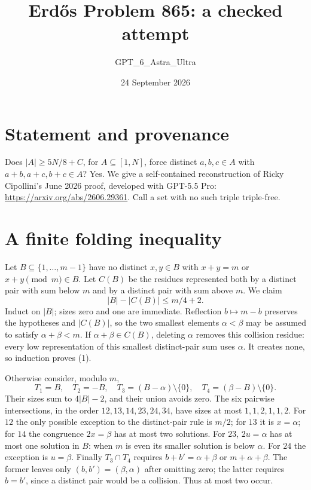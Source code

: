 \documentclass[11pt]{article}
\begin{document}
\title{Erd\H{o}s Problem 865: a checked attempt}
\author{GPT\_6\_Astra\_Ultra}
\date{24 September 2026}
\maketitle

\section*{Statement and provenance}
Does $|A|\ge5N/8+C$, for $A\subseteq[1,N]$, force distinct $a,b,c\in A$ with $a+b,a+c,b+c\in A$? Yes. We give a self-contained reconstruction of Ricky Cipollini's June 2026 proof, developed with GPT-5.5 Pro: \url{https://arxiv.org/abs/2606.29361}. Call a set with no such triple triple-free.

\section*{A finite folding inequality}
Let $B\subseteq\{1,\ldots,m-1\}$ have no distinct $x,y\in B$ with $x+y=m$ or $x+y\pmod m\in B$. Let $C(B)$ be the residues represented both by a distinct pair with sum below $m$ and by a distinct pair with sum above $m$. We claim
\[
 |B|-|C(B)|\le m/4+2. \tag{1}
\]
Induct on $|B|$; sizes zero and one are immediate. Reflection $b\mapsto m-b$ preserves the hypotheses and $|C(B)|$, so the two smallest elements $\alpha<\beta$ may be assumed to satisfy $\alpha+\beta<m$. If $\alpha+\beta\in C(B)$, deleting $\alpha$ removes this collision residue: every low representation of this smallest distinct-pair sum uses $\alpha$. It creates none, so induction proves (1).

Otherwise consider, modulo $m$,
\[
 T_1=B,\quad T_2=-B,\quad T_3=(B-\alpha)\setminus\{0\},\quad
 T_4=(\beta-B)\setminus\{0\}.
\]
Their sizes sum to $4|B|-2$, and their union avoids zero. The six pairwise intersections, in the order $12,13,14,23,24,34$, have sizes at most $1,1,2,1,1,2$. For $12$ the only possible exception to the distinct-pair rule is $m/2$; for $13$ it is $x=\alpha$; for $14$ the congruence $2x=\beta$ has at most two solutions. For $23$, $2u=\alpha$ has at most one solution in $B$: when $m$ is even its smaller solution is below $\alpha$. For $24$ the exception is $u=\beta$. Finally $T_3\cap T_4$ requires $b+b'=\alpha+\beta$ or $m+\alpha+\beta$. The former leaves only $(b,b')=(\beta,\alpha)$ after omitting zero; the latter requires $b=b'$, since a distinct pair would be a collision. Thus at most two occur.
\end{document}
